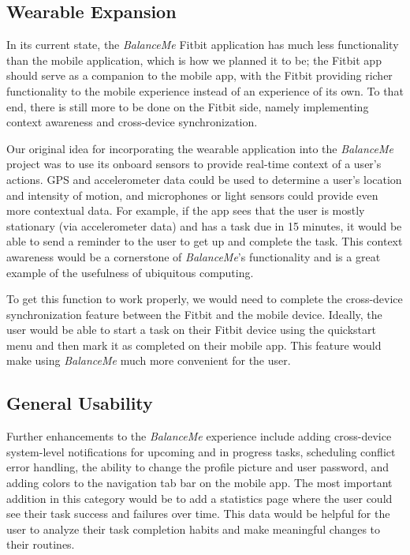\documentclass{sigchi}
\begin{document}
\subsection{Wearable Expansion}
In its current state, the \textit{BalanceMe} Fitbit application has much less
functionality than the mobile application, which is how we planned it to be;
the Fitbit app should serve as a companion to the mobile app, with the Fitbit
providing richer functionality to the mobile experience instead of an
experience of its own. To that end, there is still more to be done on the
Fitbit side, namely implementing context awareness and cross-device
synchronization.

Our original idea for incorporating the wearable application into the
\textit{BalanceMe} project was to use its onboard sensors to provide real-time
context of a user’s actions. GPS and accelerometer data could be used to
determine a user’s location and intensity of motion, and microphones or light
sensors could provide even more contextual data. For example, if the app sees
that the user is mostly stationary (via accelerometer data) and has a task due
in 15 minutes, it would be able to send a reminder to the user to get up and
complete the task. This context awareness would be a cornerstone of
\textit{BalanceMe}’s functionality and is a great example of the usefulness of
ubiquitous computing.

To get this function to work properly, we would need to complete the
cross-device synchronization feature between the Fitbit and the mobile device.
Ideally, the user would be able to start a task on their Fitbit device using
the quickstart menu and then mark it as completed on their mobile app. This
feature would make using \textit{BalanceMe} much more convenient for the user.

\subsection{General Usability}
Further enhancements to the \textit{BalanceMe} experience include adding
cross-device system-level notifications for upcoming and in progress tasks,
scheduling conflict error handling, the ability to change the profile picture
and user password, and adding colors to the navigation tab bar on the mobile
app. The most important addition in this category would be to add a statistics
page where the user could see their task success and failures over time. This
data would be helpful for the user to analyze their task completion habits and
make meaningful changes to their routines.
\end{document}
